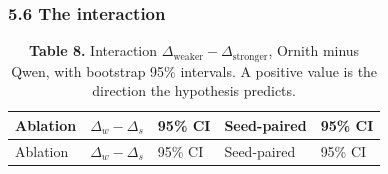\documentclass[
  10pt,
  a4paper,
]{article}
\begin{document}
\subsubsection{5.6 The interaction}\label{the-interaction}

\begin{longtable}[]{@{}
  >{\raggedright\arraybackslash}p{}
  >{\raggedleft\arraybackslash}p{}
  >{\raggedright\arraybackslash}p{}
  >{\raggedleft\arraybackslash}p{}
  >{\raggedright\arraybackslash}p{}@{}}
\caption{\textbf{Table 8.} Interaction
\(\Delta_{\text{weaker}} - \Delta_{\text{stronger}}\), Ornith minus
Qwen, with bootstrap 95\% intervals. A positive value is the direction
the hypothesis predicts.}\tabularnewline
\toprule\noalign{}
\begin{minipage}[b]{\linewidth}\raggedright
Ablation
\end{minipage} & \begin{minipage}[b]{\linewidth}\raggedleft
\(\Delta_w - \Delta_s\)
\end{minipage} & \begin{minipage}[b]{\linewidth}\raggedright
95\% CI
\end{minipage} & \begin{minipage}[b]{\linewidth}\raggedleft
Seed-paired
\end{minipage} & \begin{minipage}[b]{\linewidth}\raggedright
95\% CI
\end{minipage} \\
\midrule\noalign{}
\endfirsthead
\toprule\noalign{}
\begin{minipage}[b]{\linewidth}\raggedright
Ablation
\end{minipage} & \begin{minipage}[b]{\linewidth}\raggedleft
\(\Delta_w - \Delta_s\)
\end{minipage} & \begin{minipage}[b]{\linewidth}\raggedright
95\% CI
\end{minipage} & \begin{minipage}[b]{\linewidth}\raggedleft
Seed-paired
\end{minipage} & \begin{minipage}[b]{\linewidth}\raggedright
95\% CI
\end{minipage} \\

\end{longtable}
\end{document}
